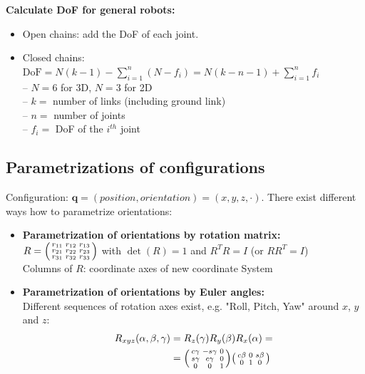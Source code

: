 \begin{multicols*}{2}
\textbf{Calculate DoF for general robots:}
\begin{itemize}
	\item Open chains: add the DoF of each joint.
	\item Closed chains:\\
	$\text{DoF} = N(k-1) - \sum_{i=1}^{n} (N-f_i) = N(k-n-1) + \sum_{i=1}^{n} f_i$ \\
	– $N=6$ for 3D, $N=3$ for 2D\\
	– $k =$ number of links (including ground link)\\
	– $n =$ number of joints\\
	– $f_i =$ DoF of the $i^{th}$ joint
\end{itemize}

\subsection{Parametrizations of configurations}
Configuration: $\mathbold{q}=(position, orientation)=(x,y,z,\cdot)$.
There exist different ways how to parametrize orientations:
\begin{itemize}
	\item \textbf{Parametrization of orientations by rotation matrix:}\\
		$R=
		\begin{psmallmatrix}
			r_{11} & r_{12} & r_{13}\\
			r_{21} & r_{22} & r_{23}\\
			r_{31} & r_{32} & r_{33}
		\end{psmallmatrix}$
		with $\det(R)=1$ and $R^T R=I$ (or $R R^T=I$) \\
		Columns of $R$: coordinate axes of new coordinate System
	\item \textbf{Parametrization of orientations by Euler angles:}\\
	Different sequences of rotation axes exist, e.g. "Roll, Pitch, Yaw" around $x$, $y$ and $z$:
	\begin{align*}
		R_{xyz}(\alpha, \beta, \gamma) &= R_z(\gamma)R_y(\beta)R_x(\alpha)=\\
		&=
		\begin{psmallmatrix}
			c\gamma & -s\gamma & 0\\
			s\gamma & c\gamma & 0\\
			0 & 0 & 1
		\end{psmallmatrix}
		\begin{psmallmatrix}
			c\beta & 0 & s\beta\\
			0 & 1 & 0\\

\end{psmallmatrix}
\end{align*}
\end{itemize}
\end{multicols*}
